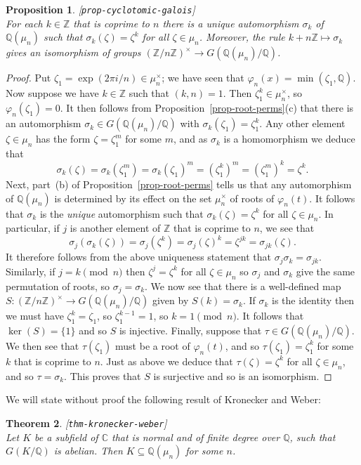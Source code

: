 \documentclass{amsart}
\newcommand{\lbl}[1]{\label{#1}\textup{[\texttt{#1}]}\ \\}
\newcommand{\lbl}{\label}
\newcommand{\Z}         {{\mathbb{Z}}}
\newcommand{\Q}         {{\mathbb{Q}}}
\newcommand{\C}         {{\mathbb{C}}}
\newcommand{\zt}        {\zeta}
\newcommand{\sg}        {\sigma}
\newcommand{\vph}       {\varphi}
\newcommand{\tm}        {\times}
\newcommand{\sse}       {\subseteq}
\renewcommand{\:}{\colon}
\newtheorem{theorem}{Theorem}[section]
\newtheorem{proposition}[theorem]{Proposition}
\theoremstyle{definition}
\begin{document}
\begin{proposition}\lbl{prop-cyclotomic-galois}
 For each $k\in\Z$ that is coprime to $n$ there is a unique
 automorphism $\sg_k$ of $\Q(\mu_n)$ such that $\sg_k(\zt)=\zt^k$ for all
 $\zt\in\mu_n$.  Moreover, the rule $k+n\Z\mapsto\sg_k$ gives an
 isomorphism of groups $(\Z/n\Z)^\tm\to G(\Q(\mu_n)/\Q)$.
\end{proposition}
\begin{proof}
 Put $\zt_1=\exp(2\pi i/n)\in\mu_n^\tm$; we have seen that
 $\vph_n(x)=\min(\zt_1,\Q)$.  Now suppose we have $k\in\Z$ such that
 $(k,n)=1$.  Then $\zt_1^k\in\mu_n^\tm$, so $\vph_n(\zt_1)=0$.  It
 then follows from Proposition~\ref{prop-root-perms}(c) that there is
 an automorphism $\sg_k\in G(\Q(\mu_n)/\Q)$ with $\sg_k(\zt_1)=\zt_1^k$.
 Any other element $\zt\in\mu_n$ has the form $\zt=\zt_1^m$ for some
 $m$, and as $\sg_k$ is a homomorphism we deduce that 
 \[ \sg_k(\zt)=\sg_k(\zt_1^m)=\sg_k(\zt_1)^m=(\zt_1^k)^m=
     (\zt_1^m)^k=\zt^k.
 \]
 Next, part~(b) of Proposition~\ref{prop-root-perms} tells us that any
 automorphism of $\Q(\mu_n)$ is determined by its effect on the set
 $\mu_n^\tm$ of roots of $\vph_n(t)$.  It follows that $\sg_k$ is the
 \emph{unique} automorphism such that $\sg_k(\zt)=\zt^k$ for all
 $\zt\in\mu_n$.  In particular, if $j$ is another element of $\Z$ that
 is coprime to $n$, we see that 
 \[ \sg_j(\sg_k(\zt))=\sg_j(\zt^k)=\sg_j(\zt)^k=\zt^{jk}=\sg_{jk}(\zt).
 \]
 It therefore follows from the above uniqueness statement that
 $\sg_j\sg_k=\sg_{jk}$.  Similarly, if $j=k\pmod{n}$ then
 $\zt^j=\zt^k$ for all $\zt\in\mu_n$ so $\sg_j$ and $\sg_k$ give the
 same permutation of roots, so $\sg_j=\sg_k$.  We now see that there
 is a well-defined map $S\:(\Z/n\Z)^\tm\to G(\Q(\mu_n)/\Q)$ given by
 $S(k)=\sg_k$.  If $\sg_k$ is the identity then we must have
 $\zt_1^k=\zt_1$, so $\zt_1^{k-1}=1$, so $k=1\pmod{n}$.  It follows
 that $\ker(S)=\{1\}$ and so $S$ is injective.  Finally, suppose that
 $\tau\in G(\Q(\mu_n)/\Q)$.  We then see that $\tau(\zt_1)$ must be a root
 of $\vph_n(t)$, and so $\tau(\zt_1)=\zt_1^k$ for some $k$ that is
 coprime to $n$.  Just as above we deduce that $\tau(\zt)=\zt^k$ for
 all $\zt\in\mu_n$, and so $\tau=\sg_k$.  This proves that $S$ is
 surjective and so is an isomorphism.
\end{proof}

We will state without proof the following result of Kronecker and
Weber: 
\begin{theorem}\lbl{thm-kronecker-weber}
 Let $K$ be a subfield of $\C$ that is normal and of finite degree
 over $\Q$, such that $G(K/\Q)$ is abelian.  Then $K\sse\Q(\mu_n)$ for
 some $n$.
\end{theorem}
\end{document}
